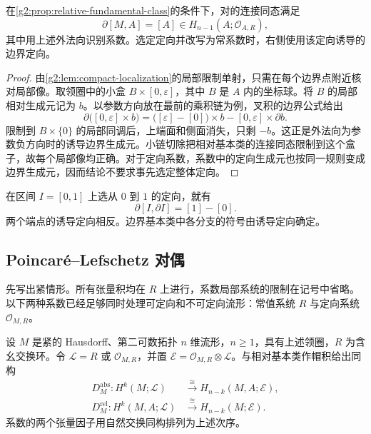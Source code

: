 \begin{proposition}\label{g2:prop:boundary-fundamental-class}
	在\cref{g2:prop:relative-fundamental-class}的条件下，对的连接同态满足
	\[
		\partial[M,A]=[A]\in H_{n-1}(A;\mathcal O_{A,R}),
	\]
	其中用上述外法向识别系数。选定定向并改写为常系数时，右侧使用该定向诱导的边界定向。
\end{proposition}
\begin{proof}
	由\cref{g2:lem:compact-localization}的局部限制单射，只需在每个边界点附近核对局部像。取领圈中的小盒 \(B\times[0,\varepsilon]\)，其中 \(B\) 是 \(A\) 内的坐标球。将 \(B\) 的局部相对生成元记为 \(b\)。以参数方向放在最前的乘积链为例，叉积的边界公式给出
	\[
		\partial\bigl([0,\varepsilon]\times b\bigr)
		=\bigl([\varepsilon]-[0]\bigr)\times b-[0,\varepsilon]\times\partial b.
	\]
	限制到 \(B\times\{0\}\) 的局部同调后，上端面和侧面消失，只剩 \(-b\)。这正是外法向为参数负方向时的诱导边界生成元。小链切除把相对基本类的连接同态限制到这个盒子，故每个局部像均正确。对于定向系数，系数中的定向生成元也按同一规则变成边界生成元，因而结论不要求事先选定整体定向。
\end{proof}

在区间 \(I=[0,1]\) 上选从 \(0\) 到 \(1\) 的定向，就有
\[
	\partial[I,\partial I]=[1]-[0].
\]
两个端点的诱导定向相反。边界基本类中各分支的符号由诱导定向确定。

\subsection{Poincaré–Lefschetz 对偶}
\label{g2:subsec:0604:02}
先写出紧情形。所有张量积均在 \(R\) 上进行，系数局部系统的限制在记号中省略。以下两种系数已经足够同时处理可定向和不可定向流形：常值系统 \(R\) 与定向系统 \(\mathcal O_{M,R}\)。

\begin{theorem}\label{g2:thm:poincare-lefschetz}
	设 \(M\) 是紧的 Hausdorff、第二可数拓扑 \(n\) 维流形，\(n\geq1\)，具有上述领圈，\(R\) 为含幺交换环。令 \(\mathcal L=R\) 或 \(\mathcal O_{M,R}\)，并置 \(\mathcal E=\mathcal O_{M,R}\otimes\mathcal L\)。与相对基本类作帽积给出同构
	\begin{align}
		D_M^{\mathrm{abs}}:H^k(M;\mathcal L)&\xrightarrow{\ \cong\ }H_{n-k}(M,A;\mathcal E),\label{g2:eq:PL-absolute}\\
		D_M^{\mathrm{rel}}:H^k(M,A;\mathcal L)&\xrightarrow{\ \cong\ }H_{n-k}(M;\mathcal E).\label{g2:eq:PL-relative}
	\end{align}
	系数的两个张量因子用自然交换同构排列为上述次序。
\end{theorem}

